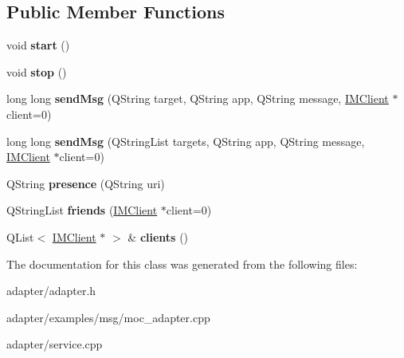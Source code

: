 \subsection*{Public Member Functions}
\begin{DoxyCompactItemize}
\item 
\hypertarget{classIMService_ad632df410e1da1384a30123ea6e2cb48}{
void {\bfseries start} ()}
\label{classIMService_ad632df410e1da1384a30123ea6e2cb48}

\item 
\hypertarget{classIMService_ad89df8cc18b93b41a64a0a158d69a997}{
void {\bfseries stop} ()}
\label{classIMService_ad89df8cc18b93b41a64a0a158d69a997}

\item 
\hypertarget{classIMService_a2929379579ad20111ced1c77f8757647}{
long long {\bfseries sendMsg} (QString target, QString app, QString message, \hyperlink{classIMClient}{IMClient} $\ast$client=0)}
\label{classIMService_a2929379579ad20111ced1c77f8757647}

\item 
\hypertarget{classIMService_abe6f85717d7d28d087ec321b65d89c14}{
long long {\bfseries sendMsg} (QStringList targets, QString app, QString message, \hyperlink{classIMClient}{IMClient} $\ast$client=0)}
\label{classIMService_abe6f85717d7d28d087ec321b65d89c14}

\item 
\hypertarget{classIMService_a7a15879d2aeca9cbe4efa7e6f77ed860}{
QString {\bfseries presence} (QString uri)}
\label{classIMService_a7a15879d2aeca9cbe4efa7e6f77ed860}

\item 
\hypertarget{classIMService_a93162cca4207e1bcfbd21ad06d595e5d}{
QStringList {\bfseries friends} (\hyperlink{classIMClient}{IMClient} $\ast$client=0)}
\label{classIMService_a93162cca4207e1bcfbd21ad06d595e5d}

\item 
\hypertarget{classIMService_a9f1c5e4f2bc3e93e308554ec7812a56d}{
QList$<$ \hyperlink{classIMClient}{IMClient} $\ast$ $>$ \& {\bfseries clients} ()}
\label{classIMService_a9f1c5e4f2bc3e93e308554ec7812a56d}

\end{DoxyCompactItemize}


The documentation for this class was generated from the following files:\begin{DoxyCompactItemize}
\item 
adapter/adapter.h\item 
adapter/examples/msg/moc\_\-adapter.cpp\item 
adapter/service.cpp\end{DoxyCompactItemize}
